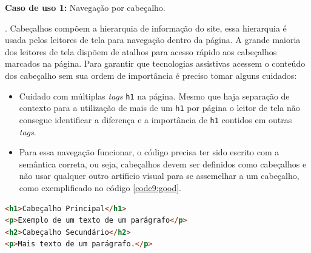 {
\vspace{1.5cm}
{\centerline{\textbf{Caso de uso 1:} Navegação por cabeçalho.}}.
Cabeçalhos compõem a hierarquia de informação do site, essa hierarquia é usada pelos leitores de tela para navegação dentro da página. A grande maioria dos leitores de tela dispõem de atalhos para acesso rápido aos cabeçalhos marcados na página. Para garantir que tecnologias assistivas acessem o conteúdo dos cabeçalho sem sua ordem de importância é preciso tomar alguns cuidados: 
\begin{itemize}
    \item Cuidado com múltiplas \textit{tags} \lstinline{h1} na página. Mesmo que haja separação de contexto para a utilização de mais de um \lstinline{h1} por página o leitor de tela não consegue identificar a diferença e a importância de \lstinline{h1} contidos em outras \textit{tags}.
    \item Para essa navegação funcionar, o código precisa ter sido escrito com a semântica correta, ou seja, cabeçalhos devem ser definidos como cabeçalhos e não usar qualquer outro artificio visual para se assemelhar a um cabeçalho, como exemplificado no código \ref{code9:good}. 
\end{itemize}
{\begin{lstlisting}[language=html,caption={cabeçalhos com hierarquia}, label=code9:good]
<h1>Cabeçalho Principal</h1>
<p>Exemplo de um texto de um parágrafo</p>
<h2>Cabeçalho Secundário</h2>
<p>Mais texto de um parágrafo.</p>
\end{lstlisting}}
}
